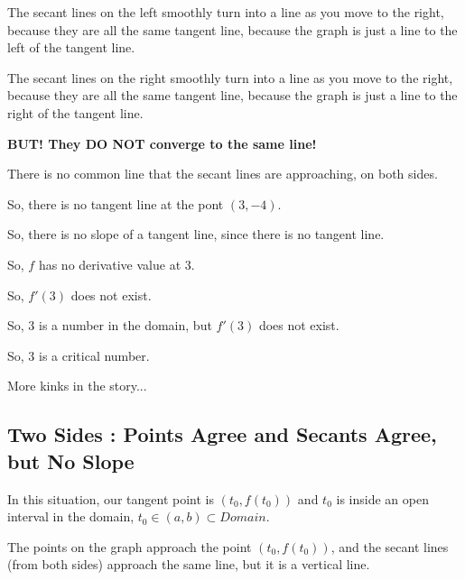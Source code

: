 \documentclass{ximera}
\begin{document}
The secant lines on the left smoothly turn into a line as you move to the right, because they are all the same tangent line, because the graph is just a line to the left of the tangent line. 

The secant lines on the right smoothly turn into a line as you move to the right, because they are all the same tangent line, because the graph is just a line to the right of the tangent line.


\begin{center}
\textbf{\textcolor{blue!55!black}{BUT!  They DO NOT converge to the same line!}}
\end{center}





There is no common line that the secant lines are approaching, on both sides. 

So, there is no tangent line at the pont $(3,-4)$. 

So, there is no slope of a tangent line, since there is no tangent line. 

So, $f$ has no derivative value at $3$.  

So, $f'(3)$ does not exist. 

So, $3$ is a number in the domain, but $f'(3)$ does not exist. 

So, $3$ is a critical number.































More kinks in the story...

\subsection*{Two Sides : Points Agree and Secants Agree, but No Slope}


In this situation, our tangent point is $(t_0 , f(t_0))$ and $t_0$ is inside an open interval in the domain, $t_0 \in (a, b) \subset Domain$. 


The points on the graph approach the point $(t_0 , f(t_0))$, and the secant lines (from both sides) approach the same line, but it is a vertical line. 
\end{document}
